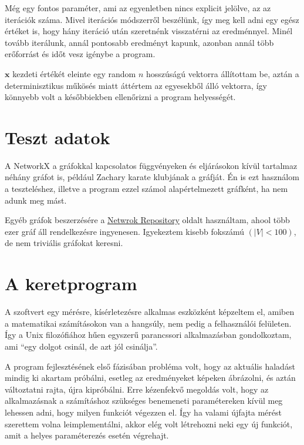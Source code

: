 \documentclass[12pt,numbers=noenddot]{report}
\begin{document}
Még egy fontos paraméter, ami az egyenletben nincs explicit jelölve, az az iterációk száma.
Mivel iterációs módszerről beszélünk, így meg kell adni egy egész értéket is, 
hogy hány iteráció után szeretnénk visszatérni az eredménnyel. Minél tovább iterálunk,
annál pontosabb eredményt kapunk, azonban annál több erőforrást és időt vesz igénybe a program.

$\boldsymbol{x}$ kezdeti értékét eleinte egy random $n$ hosszúságú vektorra állítottam be,
aztán a determinisztikus műkösés miatt áttértem az egyesekből álló vektorra, így 
könnyebb volt a későbbiekben ellenőrizni a program helyességét.


\section{Teszt adatok}

A NetworkX a gráfokkal kapcsolatos függvényeken és eljárásokon kívül 
tartalmaz néhány gráfot is, például Zachary karate klubjának a gráfját.
Én is ezt használom a teszteléshez, illetve a program ezzel számol 
alapértelmezett gráfként, ha nem adunk meg mást.

Egyéb gráfok beszerzésére a \href{https://networkrepository.com/index.php}{Netwrok Repository}
oldalt használtam, ahool több ezer gráf áll rendelkezésre ingyenesen. 
Igyekeztem kisebb fokszámú $(|V|<100)$, de nem triviális gráfokat keresni.


\section{A keretprogram}
A szoftvert egy mérésre, kísérletezésre alkalmas eszközként képzeltem el,
amiben a matematikai számításokon van a hangsúly, nem pedig a felhasználói felületen.
Így a Unix filozófiához hűen egyszerű parancssori alkalmazásban gondolkoztam,
ami ``egy dolgot csinál, de azt jól csinálja''.

A program fejlesztésének első fázisában probléma volt, hogy az aktuális haladást
mindig ki akartam próbálni, esetleg az eredményeket képeken ábrázolni, és aztán
változtatni rajta, újra kipróbálni. Erre kézenfekvő megoldás volt, hogy 
az alkalmazásnak a számításhoz szükséges benemeneti paramétereken kívül 
meg lehessen adni, hogy milyen funkciót végezzen el.
Így ha valami újfajta mérést szerettem volna leimplementálni, akkor elég volt
létrehozni neki egy új funkciót, amit a helyes paraméterezés esetén végrehajt.




\end{document}
